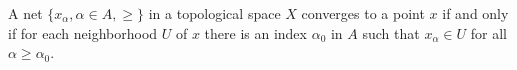 A net $\{x_\alpha, \alpha \in A, \geq\}$ in a topological space $X$ converges to a point $x$ if and only if for each neighborhood $U$ of $x$ there is an index $\alpha_0$ in $A$ such that $x_\alpha \in U$ for all $\alpha \geq \alpha_0$.
